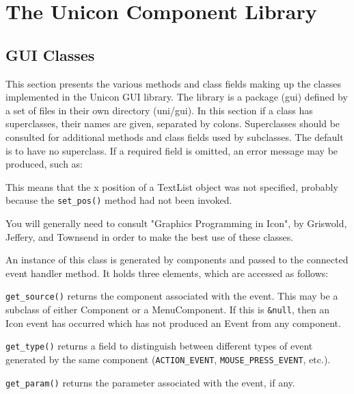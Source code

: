 \chapter{The Unicon Component Library}

\section{GUI Classes}

This section presents the various methods and class fields making up the
classes implemented in the Unicon GUI library. The library is a package
(gui) defined by a set of files in their own directory (uni/gui). In
this section if a class has superclasses, their names are given,
separated by colons. Superclasses should be consulted for additional
methods and class fields used by subclasses. The
default is to have no superclass.
If a required field is omitted, an error message may be produced,
such as:


\noindent This means that the x position of a TextList object was not specified,
probably because the \texttt{set\_pos()} method had not been invoked.

You will generally need to consult
"Graphics Programming in Icon", by
Griswold, \linebreak Jeffery, and Townsend
in order to make the best use of these classes.


An instance of this class is generated by components and passed to the
connected event handler method. It holds three elements, which
are accessed as follows:

\noindent\texttt{get\_source()} returns the component associated with the event. This may
be a subclass of either Component or a MenuComponent. If this is
\texttt{\&null}, then an Icon event has occurred which has not produced an Event
from any component.

\noindent\texttt{get\_type()} returns a field to distinguish between different types of
event generated by the same component (\texttt{ACTION\_EVENT},
\texttt{MOUSE\_PRESS\_EVENT}, etc.).

\noindent\texttt{get\_param()} returns the parameter associated with the event, if any.


